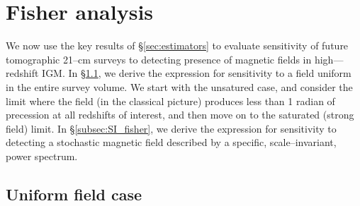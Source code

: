 \section{Fisher analysis}
\label{sec:fisher}

We now use the key results of \S\ref{sec:estimators} to evaluate sensitivity of future tomographic 21--cm surveys to detecting presence of magnetic fields in high---redshift IGM. In \S\ref{subsec:uniform_fisher}, we derive the expression for sensitivity to a field uniform in the entire survey volume. We start with the unsatured case, and consider the limit where the field (in the classical picture) produces less than 1 radian of precession at all redshifts of interest, and then move on to the saturated (strong field) limit. In \S\ref{subsec:SI_fisher}, we derive the expression for sensitivity to detecting a stochastic magnetic field described by a specific, scale--invariant, power spectrum.

\subsection{Uniform field case}
\label{subsec:uniform_fisher}

